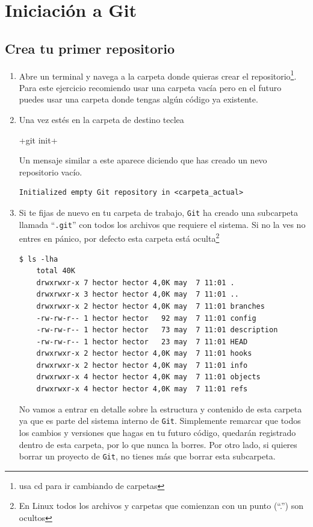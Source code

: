 \documentclass[a4paper,10pt]{article}
\begin{document}
  \section{Iniciación a Git}
    \subsection{Crea tu primer repositorio}
    \begin{enumerate}
      \item Abre un terminal y navega a la carpeta donde quieras crear el repositorio\footnote{usa cd para ir cambiando de carpetas}. Para este ejercicio recomiendo usar una carpeta vacía pero en el futuro puedes usar una carpeta donde tengas algún código ya existente. 
      
      \item Una vez estés en la carpeta de destino teclea
      
      \cverb+git init+
    
      Un mensaje similar a este aparece diciendo que has creado un nevo repositorio vacío.
      
      \begin{lstlisting}[style=custom, caption=Mensaje al inicializar git]
  Initialized empty Git repository in <carpeta_actual>
      \end{lstlisting}
      
      \item Si te fijas de nuevo en tu carpeta de trabajo, \verb+Git+ ha creado una subcarpeta llamada ``\verb+.git+'' con todos los archivos que requiere el sistema. Si no la ves no entres en pánico, por defecto esta carpeta está oculta\footnote{En Linux todos los archivos y carpetas que comienzan con un punto (``.'') son ocultos}
    
      \begin{lstlisting}[style=custom, caption=Archivos y subcarpetas por defecto del sistema .git]
  $ ls -lha
    total 40K
    drwxrwxr-x 7 hector hector 4,0K may  7 11:01 .
    drwxrwxr-x 3 hector hector 4,0K may  7 11:01 ..
    drwxrwxr-x 2 hector hector 4,0K may  7 11:01 branches
    -rw-rw-r-- 1 hector hector   92 may  7 11:01 config
    -rw-rw-r-- 1 hector hector   73 may  7 11:01 description
    -rw-rw-r-- 1 hector hector   23 may  7 11:01 HEAD
    drwxrwxr-x 2 hector hector 4,0K may  7 11:01 hooks
    drwxrwxr-x 2 hector hector 4,0K may  7 11:01 info
    drwxrwxr-x 4 hector hector 4,0K may  7 11:01 objects
    drwxrwxr-x 4 hector hector 4,0K may  7 11:01 refs
      \end{lstlisting}
    
      No vamos a entrar en detalle sobre la estructura y contenido de esta carpeta ya que es parte del sistema interno de \verb+Git+. Simplemente remarcar que todos los cambios y versiones que hagas en tu futuro código, quedarán registrado dentro de esta carpeta, por lo que nunca la borres. Por otro lado, si quieres borrar un proyecto de \verb+Git+, no tienes más que borrar esta subcarpeta.
    
    \end{enumerate}
\end{document}
